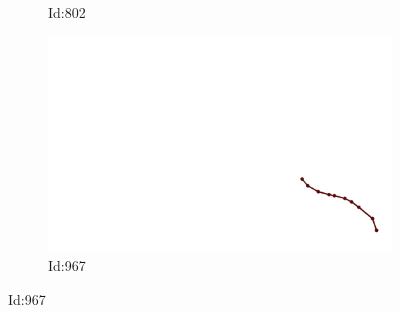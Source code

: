\documentclass[12pt,twoside]{report}
\begin{document}
\begin{figure}
\begin{subfigure}[b]{0.20\textwidth}
\caption{Id:802}
\end{subfigure}
\begin{subfigure}[b]{0.20\textwidth}
\centering
\includegraphics[width=\textwidth]{../../trajectories/967.png}
\caption{Id:967}
\end{subfigure}
\end{figure}
\end{document}
